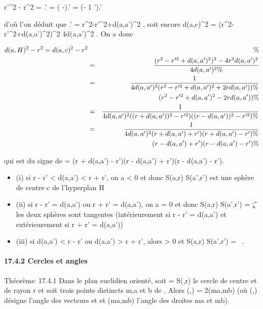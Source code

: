 \documentclass[]{article}
\begin{document}
 r'^2 - r^2  =
\overlinebc.\overlineaa' =
(\overlineac
-\overlineab).\overlineaa' =
(\overlineac - 1 
\overlineaa').\overlineaa'

d'où l'on déduit que
\overlineac.\overlineaa' =
r^2-r'^2+d(a,a')^2  , soit encore d(a,c)^2 =
(r^2-r'^2+d(a,a')^2)^2
\over 4d(a,a')^2 . On a donc

\begin{align*} d(a,H)^2 - r^2
= d(a,c)^2 - r^2&& \%&
\\ & =& (r^2 -
r'^2 + d(a,a')^2)^2 -
4r^2d(a,a')^2 \over
4d(a,a')^2 \%& \\ & =& 1
\over 4d(a,a')^2 (r^2 -
r'^2 + d(a,a')^2 + 2rd(a,a')) \%&
\\ & & \quad
(r^2 - r'^2 + d(a,a')^2 - 2rd(a,a'))
\%& \\ & =& 1 \over
4d(a,a')^2 ((r + d(a,a'))^2 -
r'^2)((r - d(a,a'))^2 - r'^2)\%&
\\ & =& 1 \over
4d(a,a')^2 (r + d(a,a') + r')(r + d(a,a') - r') \%&
\\ & & \quad (r - d(a,a')
+ r')(r - d(a,a') - r') \%& \\
\end{align*}

qui est du signe de \delta = (r + d(a,a') - r')(r - d(a,a') + r')(r - d(a,a')
- r').

\begin{itemize}
\itemsep1pt\parskip0pt
\item
  (i) si r - r' \textless{} d(a,a') \textless{} r +
  r', on a \delta \textless{} 0 et donc S(a,r) \bigcap S(a',r') est une sphère de
  centre c de l'hyperplan H
\item
  (ii) si r - r' = d(a,a') ou r + r' = d(a,a'), on a
  \delta = 0 et donc S(a,r) \bigcap S(a',r') =
  \c\~; les deux sphères sont
  tangentes (intérieurement si r - r' = d(a,a') et
  extérieurement si r + r' = d(a,a'))
\item
  (iii) si d(a,a') \textless{} r - r' ou d(a,a')
  \textgreater{} r + r', alors \delta \textgreater{} 0 et S(a,r) \bigcap S(a',r') =
  \varnothing~.
\end{itemize}

\paragraph{17.4.2 Cercles et angles}

Théorème~17.4.1 Dans le plan euclidien orienté, soit \Gamma = S(\omega,r) le
cercle de centre \omega et de rayon r et soit trois points distincts m,a et b
de \Gamma. Alors
\widehat(\overrightarrow\omegaa,\overrightarrow\omegab)
= 2\widehat(ma,mb) (où
\widehat(\overrightarrow\omegaa,\overrightarrow\omegab)
désigne l'angle des vecteurs \overrightarrow\omegaa et
\overrightarrow\omegab et
\widehat(ma,mb) l'angle des droites ma et mb).
\end{document}
